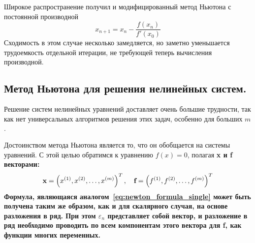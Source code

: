 Широкое распространение получил и модифицированный метод Ньютона с постоянной производной
\begin{equation}
    x_{n+1} = x_n - \frac{f(x_n)}{f'(x_0)}
\end{equation}
Сходимость в этом случае несколько замедляется, но заметно уменьшается трудоемкость отдельной итерации, не требующей
теперь вычисления производной.

\subsection{Метод Ньютона для решения нелинейных систем.}
Решение систем нелинейных уравнений доставляет очень большие трудности, так как нет универсальных алгоритмов
решения этих задач, особенно для больших $m$.

Достоинством метода Ньютона является то, что он обобщается на системы уравнений. С этой целью обратимся к уравнению
$f(x) = 0$, полагая \bf{x} и \bf{f} векторами:
\begin{equation*}
    \bf{x} = \left( x^{(1)}, x^{(2)}, \ldots, x^{(m)} \right)^T, \quad \bf{f} = \left( f^{(1)}, f^{(2)}, \ldots, f^{(m)} \right)^T
\end{equation*}
Формула, являющаяся аналогом~\eqref{eq:newton_formula_single} может быть получена таким же образом, как и для
скалярного случая, на основе разложения в ряд. При этом $\varepsilon_n$ представляет собой вектор, и разложение в
ряд необходимо проводить по всем компонентам этого вектора для \bf{f}, как функции многих переменных.

